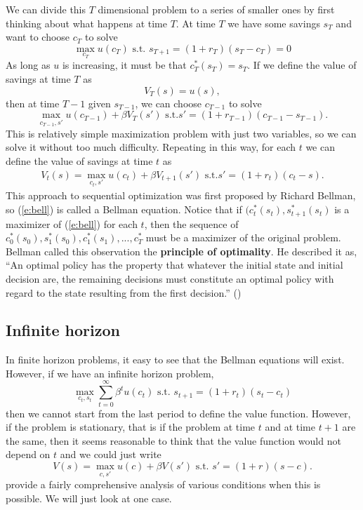 We can divide this $T$ dimensional problem to a
series of smaller ones by first thinking about what happens at time
$T$. At time $T$ we have some savings $s_T$ and want to choose $c_T$
to solve
\[ \max_{c_T} u(c_T) \text{ s.t. } s_{T+1} = (1+r_T)(s_T -c_T) = 0 \]
As long as $u$ is increasing, it must be that $c_T^*(s_T) = s_T$. If
we define the value of savings at time $T$ as
\[ V_T(s) = u(s), \]
then at time $T-1$ given $s_{T-1}$, we can choose $c_{T-1}$ to solve
\[ \max_{c_{T-1},s'} u(c_{T-1}) + \beta V_T(s') \text{ s.t.} s' =
  (1+r_{T-1})(c_{T-1}-s_{T-1}). \]
This is relatively simple maximization problem with just two
variables, so we can solve it without too much difficulty. Repeating
in this way, for each $t$ we can define the value of savings at time
$t$ as
\begin{align} 
  V_t(s) = \max_{c_t,s'} u(c_{t}) + \beta V_{t+1}(s') \text{ s.t.} s' =
  (1+r_{t})(c_{t}-s). \label{e:bell}
\end{align}
This approach to sequential optimization was first proposed by Richard
Bellman, so (\ref{e:bell}) is called a Bellman equation. Notice that
if $(c_t^*(s_t),s_{t+1}^*(s_t)$ is a maximizer of (\ref{e:bell}) for
each $t$, then 
the sequence of $c_0^*(s_0),s_1^*(s_0), c_1^*(s_1), ..., c_T^*$ must
be a maximizer of the original problem. Bellman called this
observation the \textbf{principle of optimality}. He described it as,
``An optimal policy has the property that whatever the initial state
and initial decision are, the remaining decisions must constitute an
optimal policy with regard to the state resulting from the first
decision.'' (\cite{bellman1962})

\subsection{Infinite horizon}
In finite horizon problems, it easy to see that the
Bellman equations will exist. However, if we have an infinite horizon
problem, 
\[ \max_{c_t,s_t} \sum_{t=0}^\infty \beta^t u(c_t) \text{ s.t. } s_{t+1} =
(1+r_t) (s_t - c_t) \]
then we cannot start from the last period to define the value
function. However, if the problem is stationary, that is if the
problem at time $t$ and at time $t+1$ are the same, then it seems
reasonable to think that the value function would not depend on $t$
and we could just write 
\[ V(s) = \max_{c,s'} u(c) + \beta V(s') \text{ s.t. } s' =
(1+r)(s-c). \]
\cite{stokey1989} provide a fairly comprehensive analysis of
various conditions when this is possible. We will just look at one
case. 

